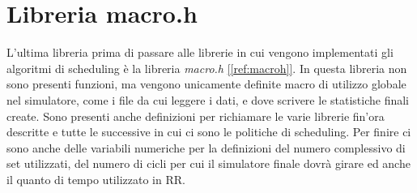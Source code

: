 \documentclass[Lau, oneside]{sapthesis}%
\begin{document}
\section{Libreria macro.h}
\label{sec:macro.h}
L'ultima libreria prima di passare alle librerie in cui vengono implementati gli algoritmi di scheduling è la libreria \textit{macro.h} \hyperref[ref:macroh]{[\ref*{ref:macroh}]}.
In questa libreria non sono presenti funzioni, ma vengono unicamente definite macro di utilizzo globale nel simulatore, come i file da cui leggere i dati, e dove scrivere le statistiche finali create.
Sono presenti anche definizioni per richiamare le varie librerie fin'ora descritte e tutte le successive in cui ci sono le politiche di scheduling.
Per finire ci sono anche delle variabili numeriche per la definizioni del numero complessivo di set utilizzati, del numero di cicli per cui il simulatore finale dovrà girare ed anche il quanto di tempo utilizzato in RR.
\end{document}
